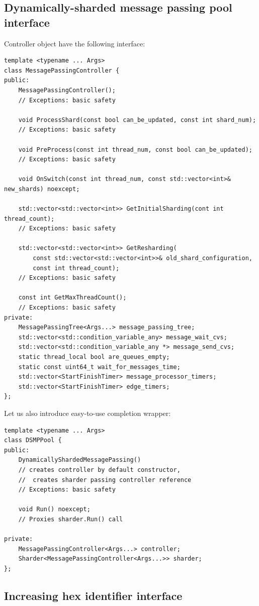 \documentclass{article}
\begin{document}
\subsection{Dynamically-sharded message passing pool interface}
Controller object have the following interface:
\begin{lstlisting}
template <typename ... Args>
class MessagePassingController {
public:
	MessagePassingController();
	// Exceptions: basic safety

	void ProcessShard(const bool can_be_updated, const int shard_num);
	// Exceptions: basic safety

	void PreProcess(const int thread_num, const bool can_be_updated);
	// Exceptions: basic safety

	void OnSwitch(const int thread_num, const std::vector<int>& new_shards) noexcept;

	std::vector<std::vector<int>> GetInitialSharding(cont int thread_count);
	// Exceptions: basic safety

	std::vector<std::vector<int>> GetResharding(
		const std::vector<std::vector<int>>& old_shard_configuration,
		const int thread_count);
	// Exceptions: basic safety

	const int GetMaxThreadCount();
	// Exceptions: basic safety
private:
	MessagePassingTree<Args...> message_passing_tree;
	std::vector<std::condition_variable_any> message_wait_cvs;
	std::vector<std::condition_variable_any *> message_send_cvs;
	static thread_local bool are_queues_empty;
	static const uint64_t wait_for_messages_time;
	std::vector<StartFinishTimer> message_processor_timers;
	std::vector<StartFinishTimer> edge_timers;
};
\end{lstlisting}

Let us also introduce easy-to-use completion wrapper:
\begin{lstlisting}
template <typename ... Args>
class DSMPPool {
public:
	DynamicallyShardedMessagePassing()
	// creates controller by default constructor,
	// 	creates sharder passing controller reference
	// Exceptions: basic safety

	void Run() noexcept;
	// Proxies sharder.Run() call

private:
	MessagePassingController<Args...> controller;
	Sharder<MessagePassingController<Args...>> sharder;
};
\end{lstlisting}
\subsection{Increasing hex identifier interface}
\end{document}
